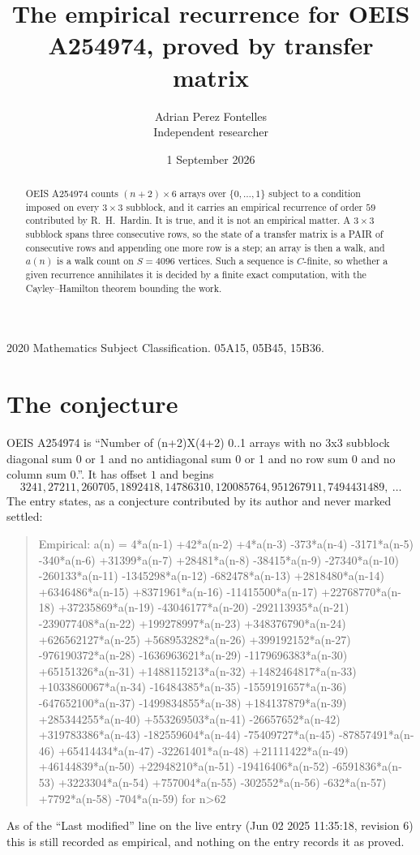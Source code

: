 \documentclass[11pt,a4paper]{article}
\title{The empirical recurrence for OEIS A254974, proved by transfer matrix}
\author{Adrian Perez Fontelles\\ \small Independent researcher}
\date{1 September 2026}
\theoremstyle{plain}
\theoremstyle{definition}
\begin{document}
\maketitle

\begin{abstract}
OEIS A254974 counts $(n+2)\times6$ arrays over $\{0,\dots,1\}$ subject to a condition imposed on
every $3\times3$ subblock, and it carries an empirical recurrence of order $59$
contributed by R.~H.~Hardin. It is true, and it is not an empirical matter. A $3\times3$
subblock spans three consecutive rows, so the state of a transfer matrix is a PAIR of
consecutive rows and appending one more row is a step; an array is then a walk, and
$a(n)$ is a walk count on $S=4096$ vertices. Such a sequence is $C$-finite, so whether a given
recurrence annihilates it is decided by a finite exact computation, with the Cayley--Hamilton
theorem bounding the work.
\end{abstract}

\noindent\small 2020 Mathematics Subject Classification. 05A15, 05B45, 15B36.\normalsize

\section{The conjecture}

OEIS A254974 is ``Number of (n+2)X(4+2) 0..1 arrays with no 3x3 subblock diagonal sum 0 or 1 and no antidiagonal sum 0 or 1 and no row sum 0 and no column sum 0.''. It has offset $1$ and begins
\[
3241, 27211, 260705, 1892418, 14786310, 120085764, 951267911, 7494431489,\ \dots
\]
The entry states, as a conjecture contributed by its author and never marked settled:
\begin{quote}
Empirical: a(n) = 4*a(n-1) +42*a(n-2) +4*a(n-3) -373*a(n-4) -3171*a(n-5) -340*a(n-6) +31399*a(n-7) +28481*a(n-8) -38415*a(n-9) -27340*a(n-10) -260133*a(n-11) -1345298*a(n-12) -682478*a(n-13) +2818480*a(n-14) +6346486*a(n-15) +8371961*a(n-16) -11415500*a(n-17) +22768770*a(n-18) +37235869*a(n-19) -43046177*a(n-20) -292113935*a(n-21) -239077408*a(n-22) +199278997*a(n-23) +348376790*a(n-24) +626562127*a(n-25) +568953282*a(n-26) +399192152*a(n-27) -976190372*a(n-28) -1636963621*a(n-29) -1179696383*a(n-30) +65151326*a(n-31) +1488115213*a(n-32) +1482464817*a(n-33) +1033860067*a(n-34) -16484385*a(n-35) -1559191657*a(n-36) -647652100*a(n-37) -1499834855*a(n-38) +184137879*a(n-39) +285344255*a(n-40) +553269503*a(n-41) -26657652*a(n-42) +319783386*a(n-43) -182559604*a(n-44) -75409727*a(n-45) -87857491*a(n-46) +65414434*a(n-47) -32261401*a(n-48) +21111422*a(n-49) +46144839*a(n-50) +22948210*a(n-51) -19416406*a(n-52) -6591836*a(n-53) +3223304*a(n-54) +757004*a(n-55) -302552*a(n-56) -632*a(n-57) +7792*a(n-58) -704*a(n-59) for n>62
\end{quote}
As of the ``Last modified'' line on the live entry (Jun 02 2025 11:35:18, revision 6) this is still
recorded as empirical, and nothing on the entry records it as proved.
\end{document}
